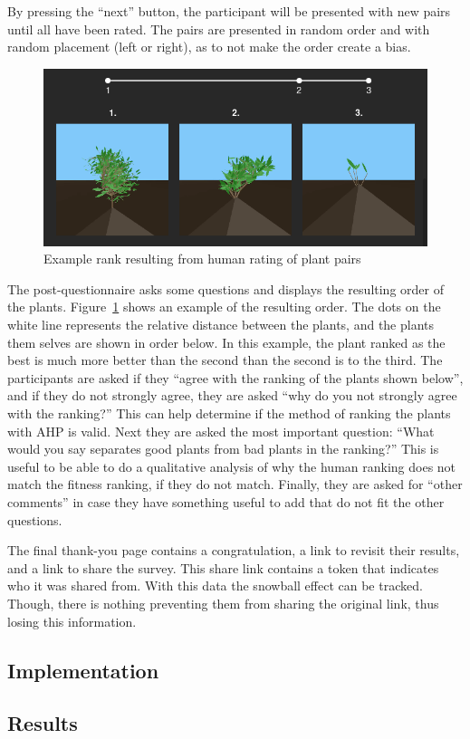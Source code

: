 By pressing the ``next'' button, the participant will be presented with new pairs until all have been rated.
The pairs are presented in random order and with random placement (left or right), as to not make the order create a bias.

\begin{figure}
    \centering
    \includegraphics[width=1.0\textwidth]{figures/rank}
    \caption{Example rank resulting from human rating of plant pairs}
    \label{fig:rank}
\end{figure}

The post-questionnaire asks some questions and displays the resulting order of the plants.
Figure~\ref{fig:rank} shows an example of the resulting order.
The dots on the white line represents the relative distance between the plants, and the plants them selves are shown in order below.
In this example, the plant ranked as the best is much more better than the second than the second is to the third.
The participants are asked if they ``agree with the ranking of the plants shown below'', and if they do not strongly agree, they are asked ``why do you not strongly agree with the ranking?''
This can help determine if the method of ranking the plants with AHP is valid.
Next they are asked the most important question: ``What would you say separates good plants from bad plants in the ranking?''
This is useful to be able to do a qualitative analysis of why the human ranking does not match the fitness ranking, if they do not match.
Finally, they are asked for ``other comments'' in case they have something useful to add that do not fit the other questions.

The final thank-you page contains a congratulation, a link to revisit their results, and a link to share the survey.
This share link contains a token that indicates who it was shared from.
With this data the snowball effect can be tracked.
Though, there is nothing preventing them from sharing the original link, thus losing this information.

\subsection{Implementation}
\subsection{Results}
